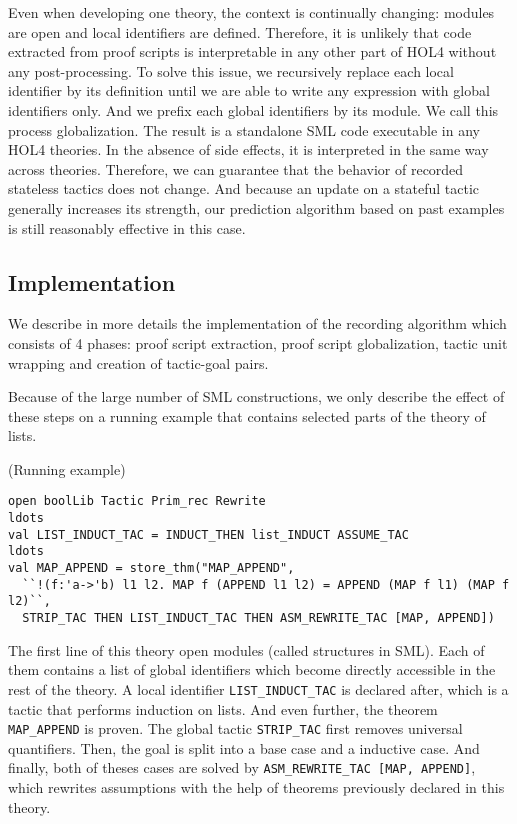 \documentclass[runningheads,a4paper,draft]{svjour3}
\def\holfour{\textsf{HOL4}\xspace}
\def\sml{\textsf{SML}\xspace}
\begin{document}
Even when developing one theory, the context is continually changing:
modules are open and local identifiers are defined. Therefore, it is unlikely
that code extracted from proof scripts is interpretable in any other part of
\holfour without any post-processing.
To solve this issue, we recursively replace each local identifier by its
definition until we are able to write any expression with global identifiers
only. And we prefix each global identifiers by its module.
We call this process globalization. The result is a standalone \sml code
executable in any \holfour theories.  In the absence of side effects, it is
interpreted in the same way across theories.
Therefore, we can guarantee that the behavior of recorded stateless tactics
does not change. And because an update on a stateful tactic
generally increases its strength, our prediction algorithm based on past
examples is still reasonably effective in this case.

\subsection{Implementation}
We describe in more details the implementation of the recording algorithm which
consists of 4 phases: proof script extraction, proof script globalization,
tactic unit wrapping and creation of tactic-goal pairs.

Because of the large number of \sml constructions, we only describe the effect
of these steps on a running example that contains selected parts of the theory
of lists.


\begin{example}\label{ex:running}(Running example)
\small
\begin{lstlisting}[language=SMLSmall]
open boolLib Tactic Prim_rec Rewrite
ldots
val LIST_INDUCT_TAC = INDUCT_THEN list_INDUCT ASSUME_TAC
ldots
val MAP_APPEND = store_thm("MAP_APPEND",
  ``!(f:'a->'b) l1 l2. MAP f (APPEND l1 l2) = APPEND (MAP f l1) (MAP f l2)``,
  STRIP_TAC THEN LIST_INDUCT_TAC THEN ASM_REWRITE_TAC [MAP, APPEND])
\end{lstlisting}
\end{example}

The first line of this theory open modules (called structures in \sml). Each of
them contains a list of global identifiers which become directly accessible in
the rest of the theory.
A local identifier \texttt{LIST\_INDUCT\_TAC} is declared after, which is a
tactic that performs induction on lists. And even further, the theorem
\texttt{MAP\_APPEND} is proven.
The global tactic \texttt{STRIP\_TAC} first removes universal quantifiers. Then,
the goal is split into a base case and a inductive case. And finally, both of
theses cases are solved by \texttt{ASM\_REWRITE\_TAC [MAP, APPEND]}, which
rewrites assumptions with the help of theorems previously declared in this
theory.
\end{document}
